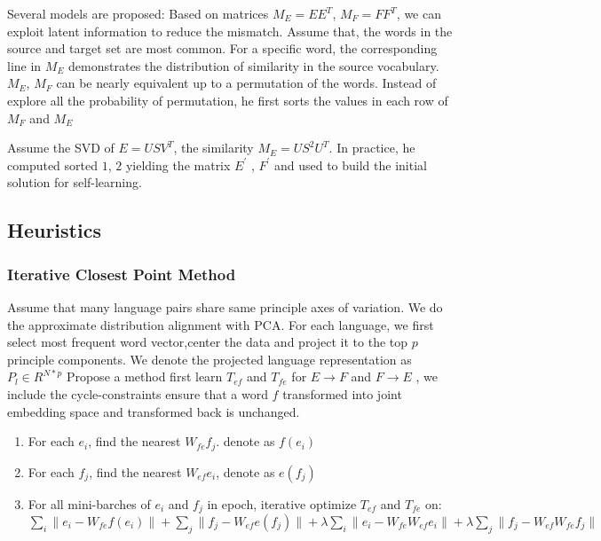 Several models are proposed:
Based on matrices ${M_E = EE^T}$, ${M_F = FF^T}$, we can exploit latent information to reduce the mismatch. Assume that, the words in the source and target set are most common. For a specific word, the corresponding line in ${M_E}$ demonstrates the distribution of similarity in the source vocabulary. ${M_E}$, ${M_F}$ can be nearly equivalent up to a permutation of the words. 
Instead of explore all the probability of permutation, he first sorts the values in each row of ${M_F}$ and ${M_E}$

Assume the SVD of ${E = USV^T}$,  the similarity ${M_E = US^2U^T}$. In practice, he computed sorted ${1}$, ${2}$	yielding the matrix ${E^{\prime}}$ , ${F^{\prime}}$ and used to build the initial solution for self-learning.

\subsection{Heuristics}
\subsubsection{Iterative Closest Point Method}
Assume that many language pairs share same principle axes of variation. We do the approximate distribution alignment with PCA.
For each language, we first select most frequent word vector,center the data and project it to the top ${p}$ principle components. We denote the projected language representation as 	${P_l \in {R}^{N * p}}$
Propose a method first learn ${T_{ef}}$ and ${T_{fe}}$ for ${E \rightarrow F}$ and ${F \rightarrow E}$ , we include the cycle-constraints ensure that a word ${f}$ transformed into joint embedding space and transformed back is unchanged. 


\begin{enumerate}
	\item For each ${e_i}$, find the nearest ${W_{fe} f_j}$.  denote as ${f(e_i)}$
	\item For each ${f_j}$, find the nearest ${W_{ef} e_i}$, denote as ${e(f_j)}$
	\item For all mini-barches of ${e_i}$ and ${f_j}$ in epoch, iterative optimize ${T_{ef}}$ and ${T_{fe}}$ on: \\
	${ \sum_{i} {\lVert e_i - W_{fe} f(e_i)\rVert} + \sum_j {\rVert f_j - W_{ef} e(f_j)\rVert} + \lambda {\sum_i}{\lVert e_i- W_{fe} W_{ef} e_i \rVert}  +  \lambda \sum_j {\lVert f_j - W_{ef} W_{fe} f_j \rVert}}$
\end{enumerate}
